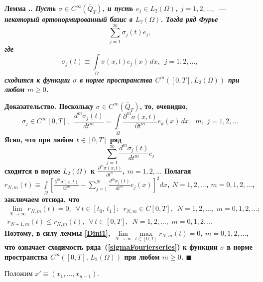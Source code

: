 \documentclass{report}
\newcounter{lem}[section]
\renewcommand{\thelem}{\thesection.\arabic{lem}}
\newenvironment{Lemma}{\par\refstepcounter{lem}\bf Лемма \thelem. \it}{\rm\par}
\newenvironment{Proof}{\par\noindent\bf Доказательство.\rm}{ $\blacksquare$\par}
\begin{document}
\begin{Lemma}\label{Fourierseriesconvergence}Пусть $\sigma\in C^\infty(\bar{Q}_T)$, и пусть $e_j\in L_2(\Omega)$, $j=1,2,\dots,$ --- некоторый ортонормированный базис в $L_2(\Omega)$.
Тогда ряд Фурье
\begin{equation}\label{sigmaFourierseries}
\sum_{j=1}^\infty\sigma_j(t)e_j,
\end{equation}
где
\begin{equation}\label{sigmakdef}
\sigma_j(t)\equiv\int\limits_\Omega\sigma(x,t)e_j(x)\,dx,\,\,\,j=1,2,\dots,
\end{equation}
сходится к функции $\sigma$ в норме пространства $C^m([0,T],L_2(\Omega))$ при любом $m\geqslant0$.
\end{Lemma}
\begin{Proof} Поскольку $\sigma\in C^\infty(\bar{Q}_T)$, то, очевидно,
\begin{equation}\label{sigmakincandder}
\sigma_j\in C^\infty[0,T],\,\,\,\frac{d^m\sigma_j(t)}{dt^m}= \int\limits_\Omega\frac{\partial^m\sigma(x,t)}{\partial t^m}e_k(x)\,dx,\,\,\,
m,\,\,j=1,2,\dots
\end{equation}
Ясно, что при любом $t\in[0,T]$ ряд
\begin{equation}\label{dssigma}
\sum_{j=1}^\infty\frac{d^m\sigma_j(t)}{dt^m}e_j
\end{equation}
сходится в норме $L_2(\Omega)$ к $\frac{\partial^m\sigma(x,t)}{\partial t^m}$, $m=1,2,\dots$ Полагая $r_{N,m}(t)\equiv\int\limits_\Omega\left[ \frac{\partial^m\sigma(x,t)}{\partial t^m}-
\sum\limits_{j=1}^N\frac{d^m\sigma_j(t)}{dt^m}e_j(x)\right]^2dx$, $N=1,2,\dots$, $m=0,1,2,\dots$, заключаем отсюда, что
\begin{gather*}
\lim_{N\to\infty}r_{N,m}(t)=0,\,\,\,\forall\,t\in[t_0,\,t_1];\,\,\, r_{N,m}\in C[0,T],\,\,\,N=1,2,\dots,\,\,m=0,1,2,\dots;\\
r_{N+1,m}(t)\leqslant r_{N,m}(t),\,\,\,\forall\,t\in[0,T],\,\,\,N=1,2,\dots,\,\,m=0,1,2,\dots
\end{gather*}
Поэтому, в силу леммы \ref{Dini1}, $\lim\limits_{N\to\infty} \max\limits_{t\in[0,T]}r_{N,m}(t)=0$, $m=0,1,2,\dots$, что означает сходимость
ряда~(\ref{sigmaFourierseries}) к функции $\sigma$ в норме пространства $C^m([0,T],\,L_2(\Omega))$ при любом $m\geqslant0$.
\end{Proof}

Положим $x'\equiv(x_1,\dots,x_{n-1})$.
\end{document}
